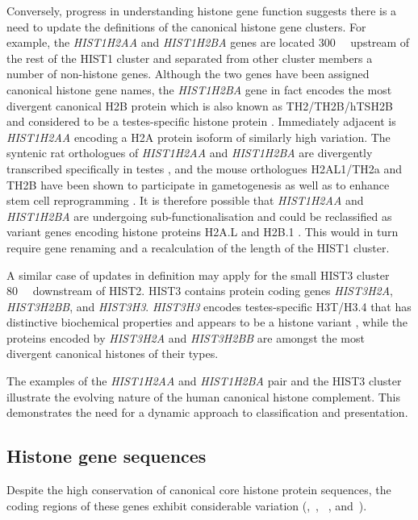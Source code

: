     Conversely, progress in understanding histone gene function
    suggests there is a need to update the definitions of the canonical histone gene clusters.
    For example, the \textit{HIST1H2AA} and \textit{HIST1H2BA} genes
    are located \SI{300}{\kilo\bp} upstream of the rest of the HIST1 cluster
    and separated from other cluster members a number of non-histone genes.
    Although the two genes have been assigned canonical histone gene names,
    the \textit{HIST1H2BA} gene in fact encodes the most divergent canonical H2B protein
    which is also known as TH2/TH2B/hTSH2B and considered to be
    a testes-specific histone protein \citep{Zalensky2002,LiAusio2005,Shinagawa2014}.
    Immediately adjacent is \textit{HIST1H2AA} encoding
    a H2A protein isoform of similarly high variation.
    The syntenic rat orthologues of \textit{HIST1H2AA} and \textit{HIST1H2BA}
    are divergently transcribed specifically in testes \citep{HuhChae1991},
    and the mouse orthologues H2AL1/TH2a and TH2B have been shown
    to participate in gametogenesis \citep{GovinCaron2007}
    as well as to enhance stem cell reprogramming \citep{ShinagawaIshii2014,PadavattanKumarevel2015}.
    It is therefore possible that \textit{HIST1H2AA} and \textit{HIST1H2BA}
    are undergoing sub-functionalisation and could be reclassified
    as variant genes encoding histone proteins H2A.L and H2B.1 \citep{Talbert2012}.
    This would in turn require gene renaming and a recalculation of the length of the HIST1 cluster.

    A similar case of updates in definition may apply
    for the small HIST3 cluster \SI{80}{\mega\bp} downstream of HIST2.
    HIST3 contains protein coding genes \textit{HIST3H2A}, \textit{HIST3H2BB}, and \textit{HIST3H3}.
    \textit{HIST3H3} encodes testes-specific H3T/H3.4
    that has distinctive biochemical properties
    and appears to be a histone variant \citep{WittExpCellRes1996,KurumizakaCOSB2013},
    while the proteins encoded by \textit{HIST3H2A} and \textit{HIST3H2BB}
    are amongst the most divergent canonical histones of their types.

    The examples of the \textit{HIST1H2AA} and \textit{HIST1H2BA} pair
    and the HIST3 cluster illustrate the evolving nature of the human canonical histone complement.
    This demonstrates the need for a dynamic approach to classification and presentation.

  \subsection{Histone gene sequences}
    Despite the high conservation of canonical core histone protein sequences,
    the coding regions of these genes exhibit considerable variation
    (,~,
    ~, and~).

